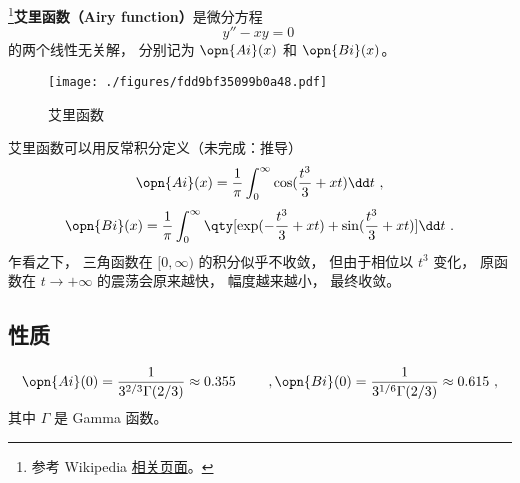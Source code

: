 
\begin{issues}
\issueTODO
\end{issues}


\footnote{参考 Wikipedia \href{https://en.wikipedia.org/wiki/Airy_function}{相关页面}。}\textbf{艾里函数（Airy function）}是微分方程
\begin{equation}\label{eq_AiryF_2}
y'' - xy = 0~
\end{equation}
的两个线性无关解， 分别记为 $\opn{Ai}(x)$ 和 $\opn{Bi}(x)$。

\begin{figure}[ht]
\centering
\texttt{[image: ./figures/fdd9bf35099b0a48.pdf]}
\caption{艾里函数} \label{fig_AiryF_1}
\end{figure}

艾里函数可以用反常积分定义（未完成：推导）
\begin{equation}
\opn{Ai}(x)=\frac 1\pi \int_0^\infty \cos(\frac{t^3}{3}+xt)\dd t~,
\end{equation}
\begin{equation}
\opn{Bi}(x)=\frac 1\pi \int_0^\infty \qty[\exp(-\frac{t^3}{3}+xt)+\sin(\frac{t^3}{3}+xt)]\dd t~.
\end{equation}
乍看之下， 三角函数在 $[0,\infty)$ 的积分似乎不收敛， 但由于相位以 $t^3$ 变化， 原函数在 $t\to+\infty$ 的震荡会原来越快， 幅度越来越小， 最终收敛。


\subsection{性质}
\begin{equation}
\opn{Ai}(0) = \frac{1}{3^{2/3} \Gamma(2/3)} \approx 0.355
\qquad~,
\opn{Bi}(0) = \frac{1}{3^{1/6} \Gamma(2/3)} \approx 0.615~,
\end{equation}
其中 $\Gamma$ 是 Gamma 函数。

